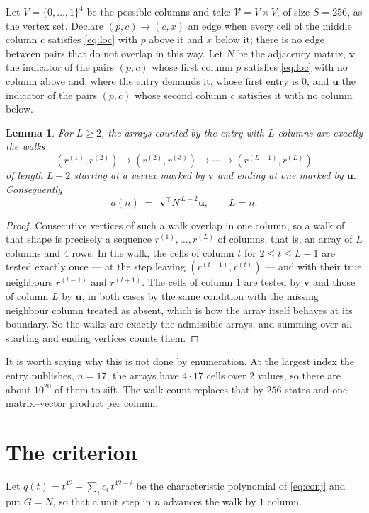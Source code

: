 \documentclass[11pt,a4paper]{article}
\theoremstyle{plain}
\newtheorem{lemma}[theorem]{Lemma}
\theoremstyle{definition}
\begin{document}
Let $V=\{0,\dots,1\}^{4}$ be the possible columns and take
$\mathcal V=V\times V$, of size $S=256$, as the vertex set. Declare $(p,c)\to(c,x)$ an edge
when every cell of the middle column $c$ satisfies \eqref{eq:loc} with $p$ above it and $x$
below it; there is no edge between pairs that do not overlap in this way. Let $N$ be the
adjacency matrix, $\mathbf{v}$ the indicator of the pairs $(p,c)$ whose first column $p$
satisfies \eqref{eq:loc} with no column above and, where the entry demands it, whose first entry is $0$, and $\mathbf{u}$ the indicator of
the pairs $(p,c)$ whose second column $c$ satisfies it with no column below.

\begin{lemma}\label{lem:walk}
For $L\ge2$, the arrays counted by the entry with $L$ columns are exactly the walks
\[
(r^{(1)},r^{(2)})\to(r^{(2)},r^{(3)})\to\cdots\to(r^{(L-1)},r^{(L)})
\]
of length $L-2$ starting at a vertex marked by $\mathbf{v}$ and ending at one marked by
$\mathbf{u}$. Consequently
\[
a(n)\;=\;\,\mathbf{v}^{\!\top}N^{\,L-2}\mathbf{u},\qquad L=n .
\]
\end{lemma}

\begin{proof}
Consecutive vertices of such a walk overlap in one column, so a walk of that shape is
precisely a sequence $r^{(1)},\dots,r^{(L)}$ of columns, that is, an array of $L$ columns
and $4$ rows. In the walk, the cells of column $t$ for $2\le t\le L-1$ are tested
exactly once --- at the step leaving $(r^{(t-1)},r^{(t)})$ --- and with their true
neighbours $r^{(t-1)}$ and $r^{(t+1)}$. The cells of column $1$ are tested by
$\mathbf{v}$ and those of column $L$ by $\mathbf{u}$, in both cases by the same condition
with the missing neighbour column treated as absent, which is how the array itself behaves at
its boundary. So the walks are exactly the admissible arrays, and summing over all starting
and ending vertices counts them.
\end{proof}


It is worth saying why this is not done by enumeration. At the largest index the entry
publishes, $n=17$, the arrays have $4\cdot17$ cells over
$2$ values, so there are about $10^{20}$ of them to sift. The
walk count replaces that by $256$ states and one matrix--vector product per column.
\section{The criterion}

Let $q(t)=t^{42}-\sum_i c_i\,t^{42-i}$ be the characteristic polynomial of
\eqref{eq:conj} and put $G=N$, so that a unit step in $n$ advances the walk by
$1$ column.
\end{document}
